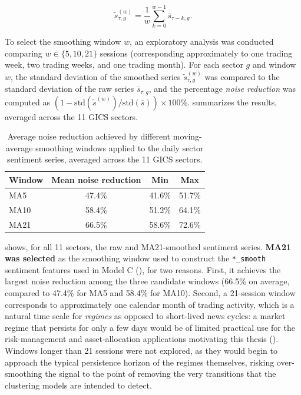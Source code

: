 \begin{equation}
  \label{eq:ma-smooth}
  \widetilde{s}_{\tau,g}^{(w)} = \frac{1}{w} \sum_{k=0}^{w-1}
  \overline{s}_{\tau-k,g}.
\end{equation}

To select the smoothing window $w$, an exploratory analysis was conducted
comparing $w \in \{5, 10, 21\}$ sessions (corresponding approximately to
one trading week, two trading weeks, and one trading month). For each
sector $g$ and window $w$, the standard deviation of the smoothed series
$\widetilde{s}_{\tau,g}^{(w)}$ was compared to the standard deviation of
the raw series $\overline{s}_{\tau,g}$, and the percentage \emph{noise
reduction} was computed as
$\left(1 - \mathrm{std}(\widetilde{s}^{(w)}) / \mathrm{std}(\overline{s})\right) \times 100\%$.
 summarizes the results, averaged across the
11 GICS sectors.

\begin{table}[H]
\centering
\caption{Average noise reduction achieved by different moving-average smoothing windows applied to the daily sector sentiment series, averaged across the 11 GICS sectors.}
\label{tab:ma-noise-reduction}
\begin{tabular}{lccc}
\toprule
\textbf{Window} & \textbf{Mean noise reduction} & \textbf{Min} & \textbf{Max} \\
\midrule
MA5  & 47.4\% & 41.6\% & 51.7\% \\
MA10 & 58.4\% & 51.2\% & 64.1\% \\
MA21 & 66.5\% & 58.6\% & 72.6\% \\
\bottomrule
\end{tabular}
\end{table}

 shows, for all 11 sectors, the raw and
MA21-smoothed sentiment series. \textbf{MA21 was selected} as the
smoothing window used to construct the \texttt{*\_smooth} sentiment
features used in Model C (), for two reasons. First,
it achieves the largest noise reduction among the three candidate windows
(66.5\% on average, compared to 47.4\% for MA5 and 58.4\% for MA10).
Second, a 21-session window corresponds to approximately one calendar
month of trading activity, which is a natural time scale for
\emph{regimes} as opposed to short-lived news cycles: a market regime that
persists for only a few days would be of limited practical use for the
risk-management and asset-allocation applications motivating this thesis
(). Windows longer than 21 sessions were not
explored, as they would begin to approach the typical persistence horizon
of the regimes themselves, risking over-smoothing the signal to the point
of removing the very transitions that the clustering models are intended
to detect.

